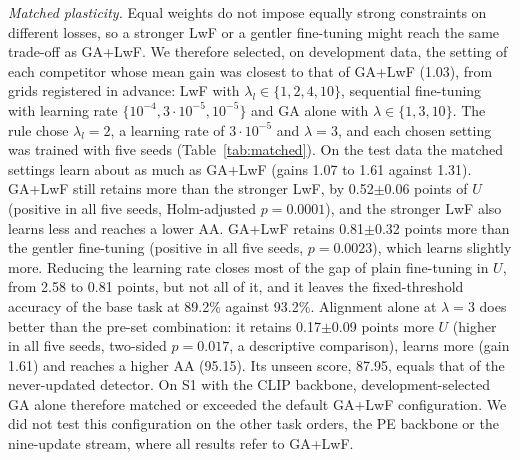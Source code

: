 \documentclass{ieeeaccess}
\begin{document}
\textit{Matched plasticity.}\label{sec:matched} Equal weights do not impose equally strong constraints on different losses, so a stronger LwF or a gentler fine-tuning might reach the same trade-off as GA+LwF. We therefore selected, on development data, the setting of each competitor whose mean gain was closest to that of GA+LwF (1.03), from grids registered in advance: LwF with $\lambda_l\in\{1,2,4,10\}$, sequential fine-tuning with learning rate $\{10^{-4},3{\cdot}10^{-5},10^{-5}\}$ and GA alone with $\lambda\in\{1,3,10\}$. The rule chose $\lambda_l=2$, a learning rate of $3{\cdot}10^{-5}$ and $\lambda=3$, and each chosen setting was trained with five seeds (Table~\ref{tab:matched}). On the test data the matched settings learn about as much as GA+LwF (gains 1.07 to 1.61 against 1.31). GA+LwF still retains more than the stronger LwF, by 0.52$\pm$0.06 points of $U$ (positive in all five seeds, Holm-adjusted $p=0.0001$), and the stronger LwF also learns less and reaches a lower AA. GA+LwF retains 0.81$\pm$0.32 points more than the gentler fine-tuning (positive in all five seeds, $p=0.0023$), which learns slightly more. Reducing the learning rate closes most of the gap of plain fine-tuning in $U$, from 2.58 to 0.81 points, but not all of it, and it leaves the fixed-threshold accuracy of the base task at 89.2\% against 93.2\%. Alignment alone at $\lambda=3$ does better than the pre-set combination: it retains 0.17$\pm$0.09 points more $U$ (higher in all five seeds, two-sided $p=0.017$, a descriptive comparison), learns more (gain 1.61) and reaches a higher AA (95.15). Its unseen score, 87.95, equals that of the never-updated detector. On S1 with the CLIP backbone, development-selected GA alone therefore matched or exceeded the default GA+LwF configuration. We did not test this configuration on the other task orders, the PE backbone or the nine-update stream, where all results refer to GA+LwF.
\end{document}
